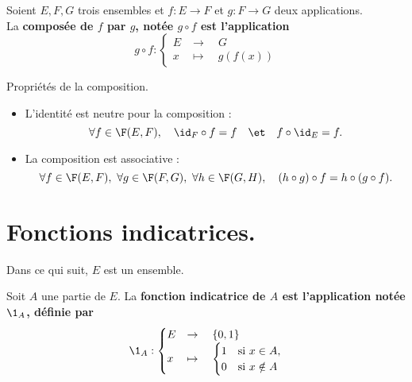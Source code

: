 \documentclass[11pt]{article}
\begin{document}
\begin{defi}{}{}
    Soient $E,F,G$ trois ensembles et $f:E\to F$ et $g:F\to G$ deux applications.\\
    La \bf{composée} de $f$ par $g$, notée $g\circ f$ est l'application
    \begin{equation*}
        g \circ f : \begin{cases}
            E &\to \quad G\\
            x &\mapsto \quad g(f(x))
        \end{cases}
    \end{equation*}
\end{defi}

\begin{prop}{Propriétés de la composition.}{}
    \begin{itemize}
        \item L'identité est neutre pour la composition :
        \begin{equation*}
            \forall f \in \F(E,F), \quad \id_F\circ f = f \quad\et\quad f\circ\id_E = f.
        \end{equation*}
        \item La composition est associative :
        \begin{equation*}
            \forall f \in \F(E,F), ~ \forall g \in \F(F,G), ~ \forall h \in \F(G,H), \quad (h\circ g)\circ f = h\circ(g\circ f).
        \end{equation*}
    \end{itemize}
\end{prop}

\section*{Fonctions indicatrices.}

Dans ce qui suit, $E$ est un ensemble.

\begin{defi}{}{}
    Soit $A$ une partie de $E$. La \bf{fonction indicatrice} de $A$ est l'application notée $\1_A$, définie par
    \begin{equation*}
        \1_A : \begin{cases}
            E &\to \quad \{0,1\}\\
            x &\mapsto \quad \begin{cases} 1 &\text{si } x\in A,\\ 0 &\text{si } x\notin A \end{cases}
        \end{cases}
    \end{equation*}
\end{defi}
\end{document}
